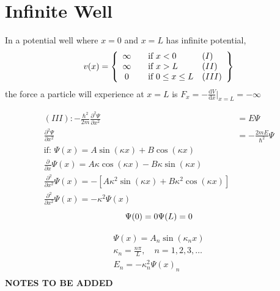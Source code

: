 \documentclass[11pt]{article}
\begin{document}
\section{Infinite Well}
\label{sec:orgd4134e1}
In a potential well where \(x = 0\) and \(x = L\) has infinite potential,
\begin{align*}
v(x) = \left\{ 
  \begin{array}{ c l l }
    \infty & \quad \text{if } x < 0 & (I) \\
    \infty & \quad \text{if } x > L & (II) \\
    0      & \quad \text{if } 0 \leq x \leq L & (III)
  \end{array}
\right \}
\end{align*}
the force a particle will experience at \(x = L\) is \(F_x = - \frac{\mathrm{d}V}{\mathrm{d}x}|_{x = L} = - \infty\)

\begin{align*}
(III): -\frac{\hbar^2}{2m} \frac{\partial^2 \Psi}{\partial x^2} &= E \Psi \\
\frac{\partial^2 \Psi}{\partial x^2} &= -\frac{2mE}{\hbar^2} \Psi \\
\text{if: } \Psi(x) = A \sin(\kappa x) + B \cos(\kappa x) \\
\frac{\partial}{\partial x}\Psi(x) = A\kappa \cos(\kappa x) - B\kappa \sin(\kappa x) \\
\frac{\partial^2}{\partial x^2}\Psi(x) = - [A\kappa^2 \sin(\kappa x) + B\kappa^2 \cos(\kappa x)] \\
\frac{\partial^2}{\partial x^2}\Psi(x) = - \kappa^2 \Psi(x)
\end{align*}
\[
    \Psi(0) = 0 \\
    \Psi(L) = 0 
\]

\begin{align*}
\Psi(x) = A_n \sin(\kappa_n x) \\
\kappa_n = \frac{n \pi}{L}, \quad n=1, 2, 3, \dots \\
E_n = - \kappa_n^2 \Psi(x)_n \\
\end{align*}
\textbf{NOTES TO BE ADDED}
\end{document}
